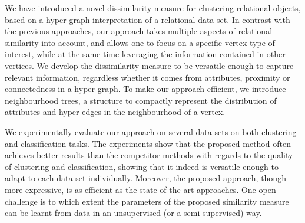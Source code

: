 We have introduced a novel dissimilarity measure for clustering relational objects, based on a hyper-graph interpretation of a relational data set.
In contrast with the previous approaches, our approach takes multiple aspects of relational similarity into account, and  allows one to focus on a specific vertex type of interest, while at the same time leveraging the information contained in other vertices.
We develop the dissimilarity measure to be versatile enough to capture relevant information, regardless whether it comes from attributes, proximity or connectedness in a hyper-graph.
To make our approach efficient, we introduce neighbourhood trees, a structure to compactly represent the distribution of attributes and hyper-edges in the neighbourhood of a vertex.


We experimentally evaluate our approach on several data sets on both clustering and classification tasks.
The experiments show that the proposed method often achieves better results than the competitor methods with regards to the quality of clustering and classification, showing that it indeed is versatile enough to adapt to each data set individually.
Moreover, the proposed approach, though more expressive, is as efficient as the state-of-the-art approaches.
One open challenge is to which extent the parameters of the proposed similarity measure can be learnt from data in an unsupervised (or a semi-supervised) way.






\cleardoublepage

